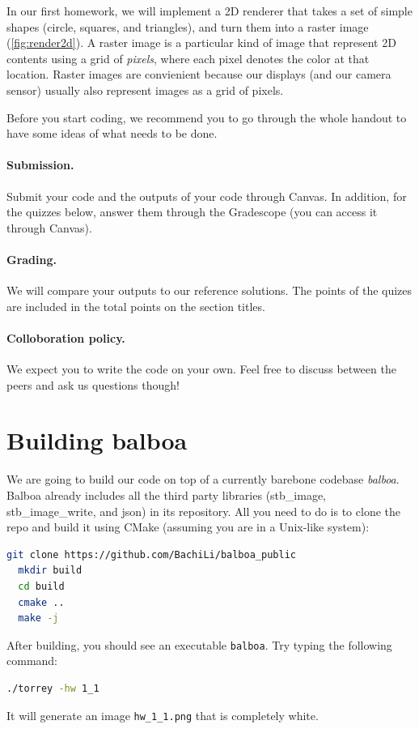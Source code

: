 In our first homework, we will implement a 2D renderer that takes a set of simple shapes (circle, squares, and triangles), and turn them into a raster image (\cref{fig:render2d}). A raster image is a particular kind of image that represent 2D contents using a grid of \emph{pixels}, where each pixel denotes the color at that location. Raster images are convienient because our displays (and our camera sensor) usually also represent images as a grid of pixels.

Before you start coding, we recommend you to go through the whole handout to have some ideas of what needs to be done.

\paragraph{Submission.} Submit your code and the outputs of your code through Canvas. In addition, for the quizzes below, answer them through the Gradescope (you can access it through Canvas).

\paragraph{Grading.} We will compare your outputs to our reference solutions. The points of the quizes are included in the total points on the section titles.

\paragraph{Colloboration policy.} We expect you to write the code on your own. Feel free to discuss between the peers and ask us questions though!

\section{Building balboa}

We are going to build our code on top of a currently barebone codebase \emph{balboa}. Balboa already includes all the third party libraries (stb\_image, stb\_image\_write, and json) in its repository.
All you need to do is to clone the repo and build it using CMake (assuming you are in a Unix-like system):
\begin{lstlisting}[language=bash]
  git clone https://github.com/BachiLi/balboa_public
  mkdir build
  cd build
  cmake ..
  make -j
\end{lstlisting}

After building, you should see an executable \lstinline{balboa}. Try typing the following command:
\begin{lstlisting}[language=bash]
  ./torrey -hw 1_1
\end{lstlisting}
It will generate an image \lstinline{hw_1_1.png} that is completely white.

